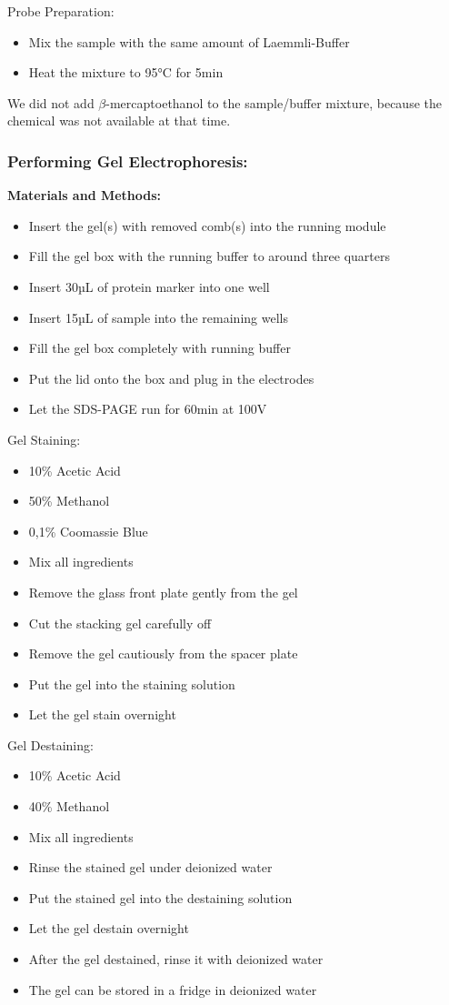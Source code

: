 Probe Preparation:
\begin{itemize}
    \item Mix the sample with the same amount of Laemmli-Buffer
    \item Heat the mixture to 95°C for 5min
\end{itemize}

We did not add \(\beta\)-mercaptoethanol to the sample/buffer mixture, because the chemical was not available at that time.

\subsubsection{Performing Gel Electrophoresis:}
\textbf{Materials and Methods:}
\begin{itemize}
    \item Insert the gel(s) with removed comb(s) into the running module
    \item Fill the gel box with the running buffer to around three quarters
    \item Insert 30µL of protein marker into one well
    \item Insert 15µL of sample into the remaining wells
    \item Fill the gel box completely with running buffer
    \item Put the lid onto the box and plug in the electrodes
    \item Let the SDS-PAGE run for 60min at 100V
\end{itemize}

Gel Staining:
\begin{itemize}
    \item 10\% Acetic Acid
    \item 50\% Methanol
    \item 0,1\% Coomassie Blue
    \item Mix all ingredients
    \item Remove the glass front plate gently from the gel
    \item Cut the stacking gel carefully off
    \item Remove the gel cautiously from the spacer plate
    \item Put the gel into the staining solution
    \item Let the gel stain overnight
\end{itemize}

Gel Destaining:
\begin{itemize}
    \item 10\% Acetic Acid
    \item 40\% Methanol
    \item Mix all ingredients
    \item Rinse the stained gel under deionized water
    \item Put the stained gel into the destaining solution
    \item Let the gel destain overnight
    \item After the gel destained, rinse it with deionized water
    \item The gel can be stored in a fridge in deionized water
\end{itemize}

